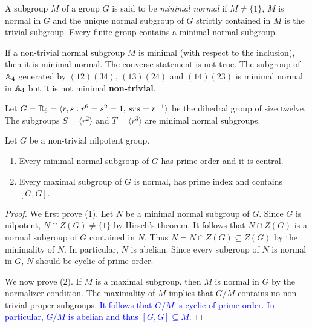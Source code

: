 A subgroup $M$ of a group $G$ is said to be {\em minimal normal} if $M\ne\{1\}$,
$M$ is normal in $G$ and the unique normal subgroup of $G$ strictly contained in $M$ is
the trivial subgroup. Every finite group contains a minimal normal subgroup.  

\begin{example}
	If a non-trivial normal subgroup $M$ is minimal (with respect to the inclusion), then it is
	minimal normal. The converse statement is not true. The subgroup of 
	$\mathbb{A}_4$ generated by $(12)(34)$, $(13)(24)$ and $(14)(23)$ is minimal normal in 
	$\mathbb{A}_4$ but it is not minimal {\bf non-trivial}. 
\end{example}

\begin{example}
	Let $G=\mathbb{D}_{6}=\langle r,s:r^6=s^2=1,\,srs=r^{-1}\rangle$ be the dihedral group
	of size twelve. The subgroups $S=\langle r^2\rangle$ 
	and $T=\langle r^3\rangle$ are minimal normal subgroups.
	\end{example}


\begin{theorem}\label{theorem:minmax_nilpotent}
	Let $G$ be a non-trivial nilpotent group. %
	\begin{enumerate}
		\item Every minimal normal subgroup of $G$ has prime order and it is central. 
		\item Every maximal subgroup of $G$ is normal, has prime index and contains $[G,G]$. 
	\end{enumerate}
\end{theorem}

\begin{proof}
	We first prove (1). Let $N$ be a minimal normal subgroup of $G$. Since $G$ is nilpotent, 
	$N\cap Z(G)\ne\{1\}$ by Hirsch's theorem. It follows that $N\cap Z(G)$ is a normal subgroup of $G$ contained in $N$. 
	Thus $N=N\cap Z(G)\subseteq
	Z(G)$ by the minimality of $N$. In particular, $N$ is abelian. Since 
	every subgroup of $N$ is normal in $G$, $N$ should be cyclic of prime order.

	We now prove (2). If $M$ is a maximal subgroup, then $M$
	is normal in $G$ by the normalizer condition. The maximality of $M$ implies that 
	$G/M$ contains no non-trivial proper subgroups. \textcolor{blue}{It follows that $G/M$ is cyclic of prime order. In particular, 
	$G/M$ is abelian and thus $[G,G]\subseteq M$.} 
\end{proof}

